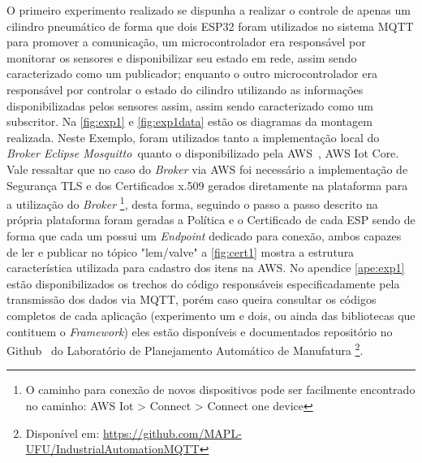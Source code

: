 O primeiro experimento realizado se dispunha a realizar o controle de apenas um cilindro pneumático de forma que dois
ESP32 foram utilizados no sistema \ac{MQTT} para promover a comunicação, um microcontrolador era responsável por monitorar 
os sensores e disponibilizar seu estado em rede, assim sendo caracterizado como um publicador; enquanto o outro 
microcontrolador era responsável por controlar o estado do cilindro utilizando as informações disponibilizadas pelos 
sensores assim, assim sendo caracterizado como um subscritor. Na \autoref{fig:exp1} e \autoref{fig:exp1data} estão os diagramas da montagem 
realizada. Neste Exemplo, foram utilizados tanto a implementação local do \textit{Broker Eclipse Mosquitto\textregistered~}quanto 
o disponibilizado pela AWS\textregistered~, AWS Iot Core. Vale ressaltar que no caso do \textit{Broker} via AWS foi necessário a 
implementação de Segurança \ac{TLS} e dos Certificados x.509 gerados diretamente na plataforma para a utilização do \textit{Broker}
\footnote{O caminho para conexão de novos dispositivos pode ser facilmente encontrado no caminho: 
AWS Iot > Connect > Connect one device}, 
desta forma, seguindo o passo a passo descrito na própria plataforma foram geradas a Política e o Certificado de cada ESP
sendo de forma que cada um possui um \textit{Endpoint} dedicado para conexão, ambos capazes de ler e publicar no tópico "lem/valve"
a \autoref{fig:cert1} mostra a estrutura característica utilizada para cadastro dos itens na AWS. No apendice \autoref{ape:exp1} 
estão disponibilizados os trechos do código responsáveis especificadamente pela transmissão dos dados via \ac{MQTT}, porém
caso queira consultar os códigos completos de cada aplicação (experimento um e dois, ou ainda das bibliotecas que contituem o \textit{Framework})
eles estão disponíveis e documentados repositório no Github\textregistered~ do Laboratório de Planejamento Automático de Manufatura \footnote{
    Disponível em: \url{https://github.com/MAPL-UFU/IndustrialAutomationMQTT}}.

